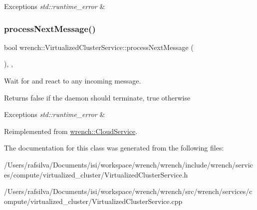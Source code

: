 \begin{DoxyExceptions}{Exceptions}
{\em std\+::runtime\+\_\+error} & \\
\hline
\end{DoxyExceptions}
\mbox{\label{classwrench_1_1_virtualized_cluster_service_aa9586ab2cda7b17c2ccccb5c465669af}} 
\subsubsection{\texorpdfstring{process\+Next\+Message()}{processNextMessage()}}
{\footnotesize\ttfamily bool wrench\+::\+Virtualized\+Cluster\+Service\+::process\+Next\+Message (\begin{DoxyParamCaption}{ }\end{DoxyParamCaption})\hspace{0.3cm}{\ttfamily [override]}, {\ttfamily [protected]}, {\ttfamily [virtual]}}



Wait for and react to any incoming message. 

\begin{DoxyReturn}{Returns}
false if the daemon should terminate, true otherwise
\end{DoxyReturn}

\begin{DoxyExceptions}{Exceptions}
{\em std\+::runtime\+\_\+error} & \\
\hline
\end{DoxyExceptions}


Reimplemented from \hyperlink{classwrench_1_1_cloud_service_a52eb0332c09751c66b1e778a572ad3e9}{wrench\+::\+Cloud\+Service}.



The documentation for this class was generated from the following files\+:\begin{DoxyCompactItemize}
\item 
/\+Users/rafsilva/\+Documents/isi/workspace/wrench/wrench/include/wrench/services/compute/virtualized\+\_\+cluster/Virtualized\+Cluster\+Service.\+h\item 
/\+Users/rafsilva/\+Documents/isi/workspace/wrench/wrench/src/wrench/services/compute/virtualized\+\_\+cluster/Virtualized\+Cluster\+Service.\+cpp\end{DoxyCompactItemize}
